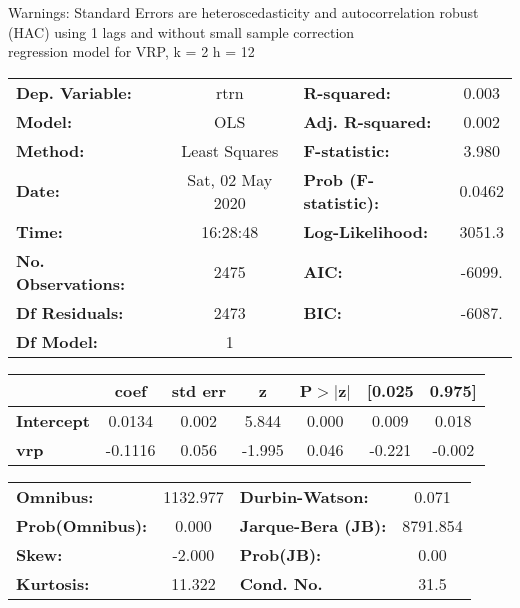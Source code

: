 Warnings: \newline
 [1] Standard Errors are heteroscedasticity and autocorrelation robust (HAC) using 1 lags and without small sample correction\\ 

regression model for VRP, k = 2 h = 12\begin{center}
\begin{tabular}{lclc}
\toprule
\textbf{Dep. Variable:}    &       rtrn       & \textbf{  R-squared:         } &     0.003   \\
\textbf{Model:}            &       OLS        & \textbf{  Adj. R-squared:    } &     0.002   \\
\textbf{Method:}           &  Least Squares   & \textbf{  F-statistic:       } &     3.980   \\
\textbf{Date:}             & Sat, 02 May 2020 & \textbf{  Prob (F-statistic):} &   0.0462    \\
\textbf{Time:}             &     16:28:48     & \textbf{  Log-Likelihood:    } &    3051.3   \\
\textbf{No. Observations:} &        2475      & \textbf{  AIC:               } &    -6099.   \\
\textbf{Df Residuals:}     &        2473      & \textbf{  BIC:               } &    -6087.   \\
\textbf{Df Model:}         &           1      & \textbf{                     } &             \\
\bottomrule
\end{tabular}
\begin{tabular}{lcccccc}
                   & \textbf{coef} & \textbf{std err} & \textbf{z} & \textbf{P$> |$z$|$} & \textbf{[0.025} & \textbf{0.975]}  \\
\midrule
\textbf{Intercept} &       0.0134  &        0.002     &     5.844  &         0.000        &        0.009    &        0.018     \\
\textbf{vrp}       &      -0.1116  &        0.056     &    -1.995  &         0.046        &       -0.221    &       -0.002     \\
\bottomrule
\end{tabular}
\begin{tabular}{lclc}
\textbf{Omnibus:}       & 1132.977 & \textbf{  Durbin-Watson:     } &    0.071  \\
\textbf{Prob(Omnibus):} &   0.000  & \textbf{  Jarque-Bera (JB):  } & 8791.854  \\
\textbf{Skew:}          &  -2.000  & \textbf{  Prob(JB):          } &     0.00  \\
\textbf{Kurtosis:}      &  11.322  & \textbf{  Cond. No.          } &     31.5  \\
\bottomrule
\end{tabular}
\end{center}

